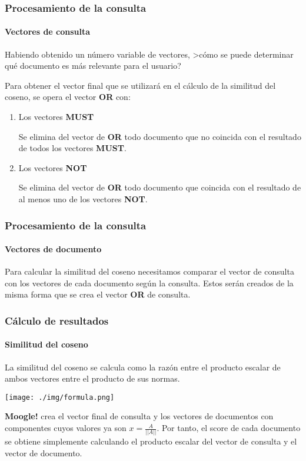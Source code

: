 \documentclass{beamer}
\begin{document}
\begin{frame}
    \frametitle{Procesamiento de la consulta}
    \framesubtitle{Vectores de consulta}
    Habiendo obtenido un n\'umero variable de vectores, >c\'omo se puede determinar qu\'e documento es m\'as relevante para el usuario? \pause
    \vspace{5mm}
    
    Para obtener el vector final que se utilizar\'a en el c\'alculo de la similitud del coseno, se opera el vector \textbf{OR} con:
    \begin{enumerate}
        \item Los vectores \textbf{MUST}
        
        \small Se elimina del vector de \textbf{OR} todo documento que no coincida con el resultado de todos los vectores \textbf{MUST}.
        
        \item Los vectores \textbf{NOT}
        
        Se elimina del vector de \textbf{OR} todo documento que coincida con el resultado de al menos uno de los vectores \textbf{NOT}.
        

    \end{enumerate}

\end{frame}
\begin{frame}
    \frametitle{Procesamiento de la consulta}
    \framesubtitle{Vectores de documento}
    Para calcular la similitud del coseno necesitamos comparar el vector de consulta con los vectores de cada documento seg\'un la consulta. Estos ser\'an creados de la misma forma que se crea el vector \textbf{OR} de consulta.
\end{frame}
\begin{frame}
    \frametitle{C\'alculo de resultados}
    \framesubtitle{Similitud del coseno}
    \justifying
    La similitud del coseno se calcula como la raz\'on entre el producto escalar de ambos vectores entre el producto de sus normas.
    \vspace{1.5mm}

    \centering
    \texttt{[image: ./img/formula.png]}
    \vspace{1.5mm}

    \justifying
    \textbf{Moogle!} crea el vector final de consulta y los vectores de documentos con componentes cuyos valores ya son $x=\frac{A}{||A||}$. Por tanto, el score de cada documento se obtiene simplemente calculando el producto escalar del vector de consulta y el vector de documento.
\end{frame}
\end{document}
